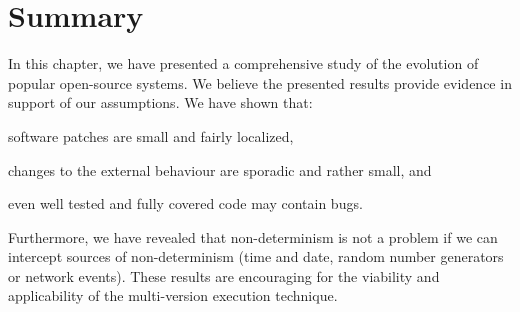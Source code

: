 \section{Summary}
\label{evolution:summary}

In this chapter, we have presented a comprehensive study of the evolution of
\numSystems popular open-source systems. We believe the presented results
provide evidence in support of our assumptions. We have shown that:%
\begin{inparaenum}[(1)]
\item software patches are small and fairly localized,
\item changes to the external behaviour are sporadic and rather small, and
\item even well tested and fully covered code may contain bugs.
\end{inparaenum}
Furthermore, we have revealed that non-determinism is not a problem if we can
intercept sources of non-determinism (\eg time and date, random number
generators or network events). These results are encouraging for the viability
and applicability of the multi-version execution technique.
